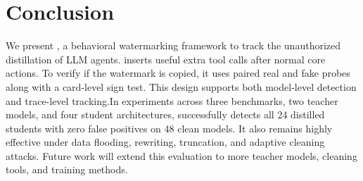 \section{Conclusion}
\label{sec:conclusion}

We present \name{}, a behavioral watermarking framework to track the unauthorized distillation of LLM agents. \name{} inserts useful extra tool calls after normal core actions. To verify if the watermark is copied, it uses paired real and fake probes along with a card-level sign test. This design supports both model-level detection and trace-level tracking.In experiments across three benchmarks, two teacher models, and four student architectures, \name{} successfully detects all 24 distilled students with zero false positives on 48 clean models. It also remains highly effective under data flooding, rewriting, truncation, and adaptive cleaning attacks. Future work will extend this evaluation to more teacher models, cleaning tools, and training methods.

